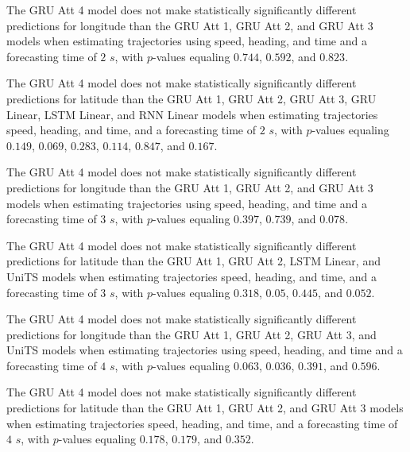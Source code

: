 The GRU Att 4 model does not make statistically significantly different predictions for longitude than the GRU Att 1, GRU Att 2, and GRU Att 3 models when estimating trajectories using speed, heading, and time and a forecasting time of $2$ $s$, with $p$-values equaling $0.744$, $0.592$, and $0.823$.


The GRU Att 4 model does not make statistically significantly different predictions for latitude than the GRU Att 1, GRU Att 2, GRU Att 3, GRU Linear, LSTM Linear, and RNN Linear models when estimating trajectories speed, heading, and time, and a forecasting time of $2$ $s$, with $p$-values equaling $0.149$, $0.069$, $0.283$, $0.114$, $0.847$, and $0.167$.


The GRU Att 4 model does not make statistically significantly different predictions for longitude than the GRU Att 1, GRU Att 2, and GRU Att 3 models when estimating trajectories using speed, heading, and time and a forecasting time of $3$ $s$, with $p$-values equaling $0.397$, $0.739$, and $0.078$.


The GRU Att 4 model does not make statistically significantly different predictions for latitude than the GRU Att 1, GRU Att 2, LSTM Linear, and UniTS models when estimating trajectories speed, heading, and time, and a forecasting time of $3$ $s$, with $p$-values equaling $0.318$, $0.05$, $0.445$, and $0.052$.


The GRU Att 4 model does not make statistically significantly different predictions for longitude than the GRU Att 1, GRU Att 2, GRU Att 3, and UniTS models when estimating trajectories using speed, heading, and time and a forecasting time of $4$ $s$, with $p$-values equaling $0.063$, $0.036$, $0.391$, and $0.596$.


The GRU Att 4 model does not make statistically significantly different predictions for latitude than the GRU Att 1, GRU Att 2, and GRU Att 3 models when estimating trajectories speed, heading, and time, and a forecasting time of $4$ $s$, with $p$-values equaling $0.178$, $0.179$, and $0.352$.

